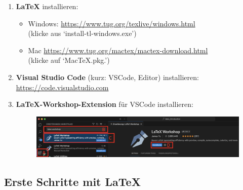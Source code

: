 \documentclass[a4paper,12pt,twoside]{article}
\begin{document}
\begin{enumerate}
    \item \textbf{LaTeX} installieren:
    \begin{itemize}
        \item Windows: \url{https://www.tug.org/texlive/windows.html}\\(klicke aus `install-tl-windows.exe')
        \item Mac \url{https://www.tug.org/mactex/mactex-download.html}\\(klicke auf `MacTeX.pkg.')
    \end{itemize}
    \item \textbf{Visual Studio Code} (kurz: VSCode, Editor) installieren:\\ \url{https://code.visualstudio.com}
    \item \textbf{LaTeX-Workshop-Extension} für VSCode installieren:
    \begin{figure}[H]
		\centering
		\includegraphics[width=\textwidth]{latex_workshop}
	\end{figure}
\end{enumerate}

\subsection{Erste Schritte mit LaTeX}
\end{document}
